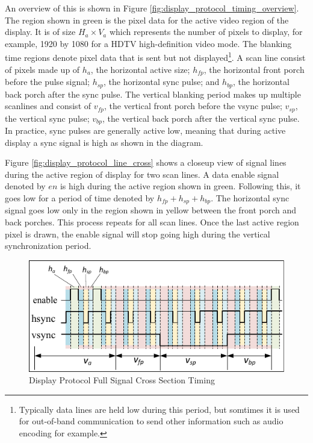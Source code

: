     An overview of this is shown in Figure \ref{fig:display_protocol_timing_overview}. The region shown in green is the pixel data for the active video region of the display. It is of size $H_a\times V_a$ which represents the number of pixels to display, for example, 1920 by 1080 for a HDTV high-definition video mode\cite{MythTVWebsite}. The blanking time regions denote pixel data that is sent but not displayed\footnote{Typically data lines are held low during this period, but somtimes it is used for out-of-band communication to send other information such as audio encoding for example.}. A scan line consist of pixels made up of $h_a$, the horizontal active size; $h_{fp}$, the horizontal front porch before the pulse signal; $h_{sp}$, the horizontal sync pulse; and $h_{bp}$, the horizontal back porch after the sync pulse. The vertical blanking period makes up multiple scanlines and consist of $v_{fp}$, the vertical front porch before the vsync pulse; $v_{sp}$, the vertical sync pulse; $v_{bp}$, the vertical back porch after the vertical sync pulse. In practice, sync pulses are generally active low, meaning that during active display a sync signal is high as shown in the diagram.

    Figure \ref{fig:display_protocol_line_cross} shows a closeup view of signal lines during the active region of display for two scan lines. A data enable signal denoted by $en$ is high during the active region shown in green. Following this, it goes low for a period of time denoted by $h_{fp}+h_{sp}+h_{bp}$. The horizontal sync signal goes low only in the region shown in yellow between the front porch and back porches. This process repeats for all scan lines. Once the last active region pixel is drawn, the enable signal will stop going high during the vertical synchronization period.


    \begin{figure}
        \centering
        \includegraphics[width=1.0\textwidth]{fig/display_timing_full_cross.pdf}
        \caption{Display Protocol Full Signal Cross Section Timing}
        \label{fig:display_protocol_full_cross}
    \end{figure}

